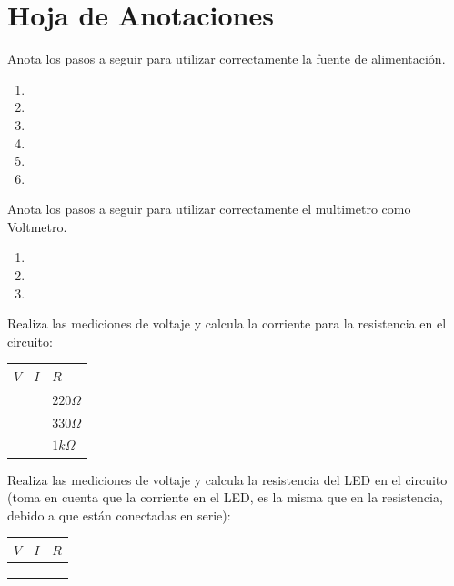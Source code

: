 \documentclass[paper=letter, fontsize=11pt]{scrartcl} %
\numberwithin{equation}{section} %
\numberwithin{figure}{section} %
\numberwithin{table}{section} %
\begin{document}

\clearpage
\section{Hoja de Anotaciones}
	Anota los pasos a seguir para utilizar correctamente la fuente de alimentación.

	\begin{enumerate}
		\item
		\item
		\item
		\item
		\item
		\item
	\end{enumerate}

	Anota los pasos a seguir para utilizar correctamente el multimetro como Voltmetro.

	\begin{enumerate}
		\item
		\item
		\item
	\end{enumerate}

	Realiza las mediciones de voltaje y calcula la corriente para la resistencia en el circuito:

	\begin{center}
		\begin{tabular}{|p{1.5cm}|p{1.5cm}|p{1.5cm}|}
			\hline
			$V$ & $I$ & $R$          \\
			\hline
			    &     & $220 \Omega$ \\
			\hline
			    &     & $330 \Omega$ \\
			\hline
			    &     & $1 k \Omega$ \\
			\hline
		\end{tabular}
	\end{center}

	Realiza las mediciones de voltaje y calcula la resistencia del LED en el circuito (toma en cuenta que la corriente en el LED, es la misma que en la resistencia, debido a que están conectadas en serie):

	\begin{center}
		\begin{tabular}{|p{1.5cm}|p{1.5cm}|p{1.5cm}|}
			\hline
			$V$ & $I$ & $R$ \\
			\hline
			    &     &     \\
			\hline
			    &     &     \\
			\hline
			    &     &     \\
			\hline
		\end{tabular}
	\end{center}
\end{document}
